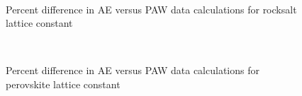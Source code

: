 \documentclass[10pt]{revtex4}
\begin{document}
\begin{figure}[H]
\begin{center}
{\resizebox{13.0cm}{!}
{}} \\
\caption{Percent difference in AE versus PAW data calculations for rocksalt lattice constant}
\label{fig3}
\end{center}
\end{figure}

\begin{figure}[H]
\begin{center}
{\resizebox{12.0cm}{!}
{}} \\
\caption{Percent difference in AE versus PAW data calculations for perovskite lattice constant}
\label{fig4}
\end{center}
\end{figure}
\end{document}
